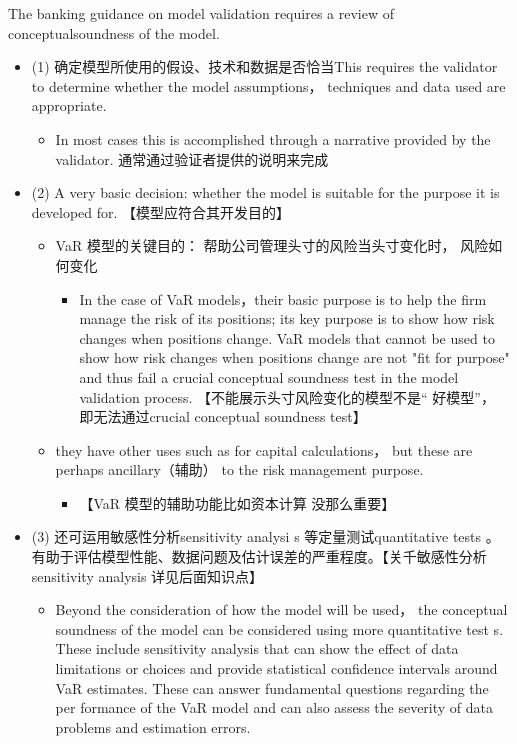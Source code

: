 The banking guidance on model validation requires a review of conceptualsoundness of the model.
    \begin{itemize}
    \item (1) 确定模型所使用的假设、技术和数据是否恰当This requires the validator to determine whether the model assumptions， techniques and data used are appropriate.
        \begin{itemize}
        \item In most cases this is accomplished through a narrative provided by the validator. 通常通过验证者提供的说明来完成
        \end{itemize}
    \item (2) A very basic decision: whether the model is suitable for the purpose it is developed for. 【模型应符合其开发目的】
        \begin{itemize}
        \item VaR 模型的关键目的： 帮助公司管理头寸的风险当头寸变化时， 风险如何变化
            \begin{itemize}
            \item In the case of VaR models，their basic purpose is to help the firm manage the risk of its positions; its key purpose is to show how risk changes when positions change. VaR models that cannot be used to show how risk changes when positions change are not "fit for purpose" and thus fail a crucial conceptual soundness test in the model validation process. 【不能展示头寸风险变化的模型不是“ 好模型”， 即无法通过crucial conceptual soundness test】
            \end{itemize}
        \item they have other uses such as for capital calculations， but these are perhaps ancillary（辅助） to the risk management purpose.
            \begin{itemize}
            \item 【VaR 模型的辅助功能比如资本计算 没那么重要】
            \end{itemize}
        \end{itemize}
    \item (3) 还可运用敏感性分析sensitivity analysi s 等定量测试quantitative tests 。有助于评估模型性能、数据问题及估计误差的严重程度。【关千敏感性分析sensitivity analysis 详见后面知识点】
        \begin{itemize}
         \item Beyond the consideration of how the model will be used， the conceptual soundness of the model can be considered using more quantitative test s.
        These include sensitivity analysis that can show the effect of data limitations or choices and provide statistical confidence intervals around VaR estimates.
        These can answer fundamental questions regarding the per formance of the VaR model and can also assess the severity of data problems and estimation errors.
        \end{itemize}
    \end{itemize}

